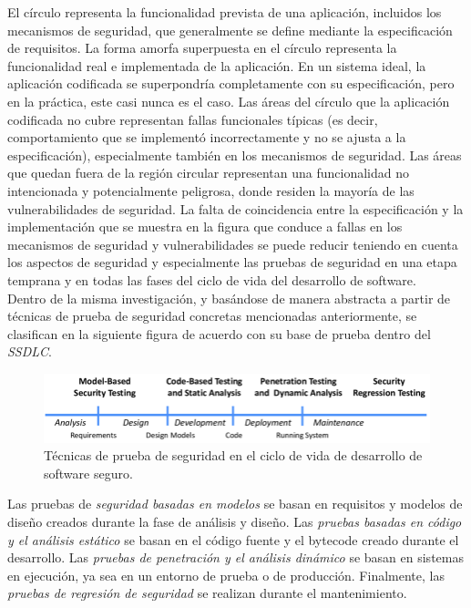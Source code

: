 El círculo representa la funcionalidad prevista de una aplicación, incluidos los mecanismos de seguridad, que generalmente se define mediante la especificación de requisitos. La forma amorfa superpuesta en el círculo representa la funcionalidad real e implementada de la aplicación. En un sistema ideal, la aplicación codificada se superpondría completamente con su especificación, pero en la práctica, este casi nunca es el caso. Las áreas del círculo que la aplicación codificada no cubre representan fallas funcionales típicas (es decir, comportamiento que se implementó incorrectamente y no se ajusta a la especificación), especialmente también en los mecanismos de seguridad. Las áreas que quedan fuera de la región circular representan una funcionalidad no intencionada y potencialmente peligrosa, donde residen la mayoría de las vulnerabilidades de seguridad. La falta de coincidencia entre la especificación y la implementación que se muestra en la figura que conduce a fallas en los mecanismos de seguridad y vulnerabilidades se puede reducir teniendo en cuenta los aspectos de seguridad y especialmente las pruebas de seguridad en una etapa temprana y en todas las fases del ciclo de vida del desarrollo de software.\\

Dentro de la misma investigación, y basándose de manera abstracta a partir de técnicas de prueba de seguridad concretas mencionadas anteriormente, se clasifican en la siguiente figura de acuerdo con su base de prueba dentro del \textit{SSDLC}.\\

\begin{figure}[ht]
    \centering
    \includegraphics[scale=0.5]{images/TechniquesInTheSSDLC.png}
    \caption{Técnicas de prueba de seguridad en el ciclo de vida de desarrollo de software seguro.}
    \label{fig:ssdlc techniques}
\end{figure}

Las pruebas de \textit{seguridad basadas en modelos} se basan en requisitos y modelos de diseño creados durante la fase de análisis y diseño. Las \textit{pruebas basadas en código y el análisis estático} se basan en el código fuente y el bytecode creado durante el desarrollo. Las \textit{pruebas de penetración y el análisis dinámico} se basan en sistemas en ejecución, ya sea en un entorno de prueba o de producción. Finalmente, las \textit{pruebas de regresión de seguridad} se realizan durante el mantenimiento.


